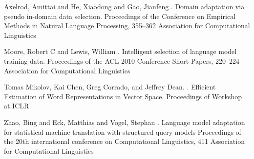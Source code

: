 \documentclass[11pt]{article}
\begin{document}
\begin{thebibliography}{}

Axelrod, Amittai and He, Xiaodong and Gao, Jianfeng
.
\newblock Domain adaptation via pseudo in-domain data selection.
\newblock Proceedings of the Conference on Empirical Methods in Natural Language Processing, 
355--362
\newblock
Association for Computational Linguistics

Moore, Robert C and Lewis, William
.
\newblock Intelligent selection of language model training data.
\newblock Proceedings of the ACL 2010 Conference Short Papers, 
220--224
\newblock
Association for Computational Linguistics

Tomas Mikolov, Kai Chen, Greg Corrado, and Jeffrey Dean.
.
\newblock Efficient Estimation of Word Representations in Vector Space.
\newblock Proceedings of Workshop at ICLR

Zhao, Bing and Eck, Matthias and Vogel, Stephan
.
\newblock Language model adaptation for statistical machine translation with structured query models
\newblock Proceedings of the 20th international conference on Computational Linguistics, 
411
\newblock
Association for Computational Linguistics





\end{thebibliography}
\end{document}
